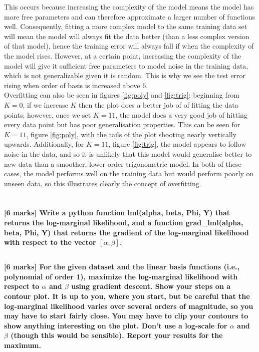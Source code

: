 \documentclass[12pt,twoside]{article}
\begin{document}
This occurs because increasing the complexity of the model means the model has more free parameters and can therefore approximate a larger number of functions well. Consequently, fitting a more complex model to the same training data set will mean the model will always fit the data better (than a less complex version of that model), hence the training error will always fall if when the complexity of the model rises. However, at a certain point, increasing the complexity of the model will give it sufficient free parameters to model noise in the training data, which is not generalizable given it is random. This is why we see the test error rising when order of basis is increased above 6. \\

Overfitting can also be seen in figures \ref{fig:poly} and \ref{fig:trig}: beginning from $K=0$, if we increase $K$ then the plot does a better job of of fitting the data points; however, once we set $K=11$, the model does a very good job of hitting every data point but has poor generalisation properties. This can be seen for $K=11$, figure \ref{fig:poly}, with the tails of the plot shooting nearly vertically upwards. Additionally, for $K=11$, figure \ref{fig:trig}, the model appears to follow noise in the data, and so it is unlikely that this model would generalise better to new data than a smoother, lower-order trigonometric model. In both of these cases, the model performs well on the training data but would perform poorly on unseen data, so this illustrates clearly the concept of overfitting.

\newpage

\section{}

\subsection{}
\textbf{[6 marks] Write a python function lml(alpha, beta, Phi, Y) that returns the log-marginal likelihood, and a function grad\_lml(alpha, beta, Phi, Y) that returns the gradient of the log-marginal likelihood with respect to the vector $[\alpha, \beta]$.}


\subsection{}
\textbf{[6 marks] For the given dataset and the linear basis functions (i.e., polynomial of order 1), maximize the log-marginal likelihood with respect to $\alpha$ and $\beta$ using gradient descent. Show your steps on a contour plot. It is up to you, where you start, but be careful that the log-marginal likelihood varies over several orders of magnitude, so you may have to start fairly close. You may have to clip your contours to show anything interesting on the plot. Don’t use a log-scale for $\alpha$ and $\beta$ (though this would be sensible). Report your results for the maximum.} \\
\end{document}
